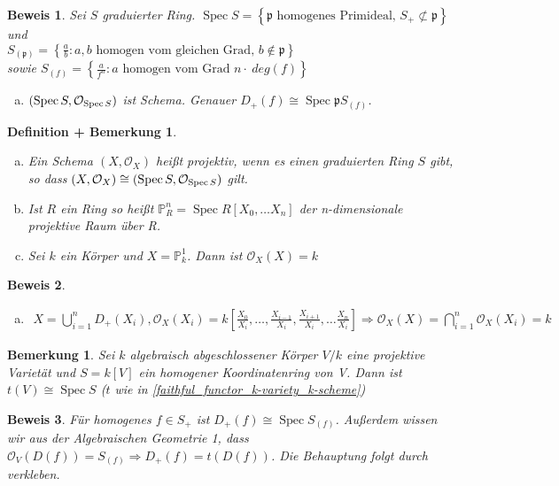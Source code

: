\documentclass[a4paper,oneside]{scrbook}
\theoremstyle{break}
\newtheorem{DefBem}[Def]{Definition + Bemerkung}
\newtheorem{Bem}[Def]{Bemerkung}
\theoremstyle{nonumberbreak}
\theoremstyle{nonumberplain}
\newtheorem{Bew}{Beweis}
\theoremstyle{break}
\newcommand{\Spec}{%
	\ensuremath{\operatorname{Spec}}%
}
\newcommand{\Proj}{%
	\ensuremath{\operatorname{Spec}}%
}
\begin{document}
\begin{Bew}
 Sei $S$ graduierter Ring. $\Proj{S} = \left\lbrace \mathfrak{p} \text{ homogenes Primideal, } S_+ \not\subset \mathfrak{p} \right\rbrace$ und \\
$S_{(\mathfrak{p})}=\left\lbrace \frac{a}{b}: a,b \text{ homogen vom gleichen Grad, } b \notin \mathfrak{p} \right\rbrace $ \\
sowie $S_{(f)}=\left\lbrace \frac{a}{f^n}: a \text{ homogen vom Grad } n \cdot~ deg(f) \right\rbrace $
\begin{enumerate}[(g)]
 \item $(\Proj S, \mathcal{O}_{\Proj S})$ ist Schema. Genauer $D_+(f) \cong \Spec{\mathfrak{p} S_{(f)}}$.  
\end{enumerate}

\end{Bew}

\begin{DefBem}
	\begin{enumerate}[(a)]
		\item Ein Schema $(X,\mathcal{O}_X)$ heißt projektiv, wenn es einen graduierten Ring $S$ gibt, so dass $(X,\mathcal{O}_X) \cong (\Proj S, \mathcal{O}_{\Proj S})$  gilt.
		\item Ist $R$ ein Ring so heißt $\mathbb{P}^n_R = \Proj {R[X_0,\dots X_n]}$ der n-dimensionale projektive Raum über R.
		\item Sei $k$ ein Körper und $X=\mathbb{P}^1_k$. Dann ist $\mathcal{O}_X(X)=k$
	\end{enumerate}
\end{DefBem}
\begin{Bew}
	\begin{enumerate}[(c)]
		\item
			\begin{align*}
			 X = \bigcup_{i=1}^n D_+(X_i), \mathcal{O}_X(X_i)=k[\frac{X_0}{X_i},\dots,\frac{X_{i-1}}{X_i}, \frac{X_{i+1}}{X_i}, \dots \frac{X_n}{X_i} ] \Rightarrow \mathcal{O}_X(X) = \bigcap_{i=1}^n \mathcal{O}_X(X_i)=k
			\end{align*}
 
	\end{enumerate}
\end{Bew}

\begin{Bem}
	Sei $k$ algebraisch abgeschlossener Körper $V/k$ eine projektive Varietät und $S=k[V]$ ein homogener Koordinatenring von V. Dann ist $t(V) \cong \Proj S$ ($t$ wie in \ref{faithful_functor_k-variety_k-scheme})
\end{Bem}
\begin{Bew}
	Für homogenes $f \in S_+$ ist $D_+(f) \cong \Spec{S_{(f)}}$. Außerdem wissen wir aus der Algebraischen Geometrie 1, dass $\mathcal{O}_V(D(f))=S_{(f)} \Rightarrow D_+(f)=t(D(f))$.
	Die Behauptung folgt durch verkleben.
\end{Bew}
\end{document}
